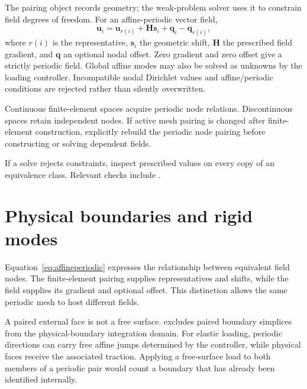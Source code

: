 The pairing object records geometry; the weak-problem solver uses it to constrain field degrees of freedom. For an affine-periodic vector field,
\begin{equation}\label{eq:affineperiodic}
\bm u_i=\bm u_{r(i)}+\bm H\bm s_i+\bm q_i-\bm q_{r(i)},
\end{equation}
where $r(i)$ is the representative, $\bm s_i$ the geometric shift, $\bm H$ the prescribed field gradient, and $\bm q$ an optional nodal offset. Zero gradient and zero offset give a strictly periodic field. Global affine modes may also be solved as unknowns by the loading controller. Incompatible nodal Dirichlet values and affine/periodic conditions are rejected rather than silently overwritten.

Continuous finite-element spaces acquire periodic node relations. Discontinuous spaces retain independent nodes. If active mesh pairing is changed after finite-element construction, explicitly rebuild the periodic node pairing before constructing or solving dependent fields.


If a solve rejects constraints, inspect prescribed values on every copy of an equivalence class. Relevant checks include .

\section{Physical boundaries and rigid modes}
Equation~\eqref{eq:affineperiodic} expresses the relationship between equivalent field nodes. The finite-element pairing supplies representatives and shifts, while the field supplies its gradient and optional offset. This distinction allows the same periodic mesh to host different fields.

A paired external face is not a free surface.  excludes paired boundary simplices from the physical-boundary integration domain. For elastic loading, periodic directions can carry free affine jumps determined by the controller, while physical faces receive the associated traction. Applying a free-surface load to both members of a periodic pair would count a boundary that has already been identified internally.

